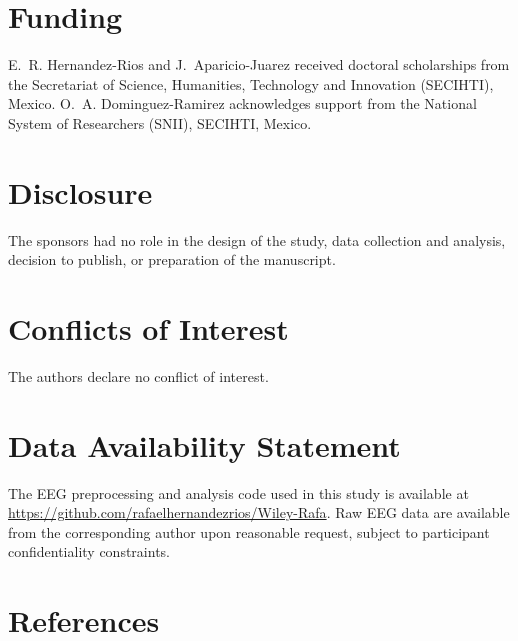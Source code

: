 \documentclass[10pt]{iopart}
\begin{document}
\section*{Funding}
E.~R. Hernandez-Rios and J.~Aparicio-Juarez received doctoral
scholarships from the Secretariat of Science, Humanities,
Technology and Innovation (SECIHTI), Mexico.
O.~A. Dominguez-Ramirez acknowledges support from the
National System of Researchers (SNII), SECIHTI, Mexico.

\section*{Disclosure}
The sponsors had no role in the design of the study,
data collection and analysis, decision to publish,
or preparation of the manuscript.

\section*{Conflicts of Interest}
The authors declare no conflict of interest.

\section*{Data Availability Statement}
The EEG preprocessing and analysis code used in this study
is available at \url{https://github.com/rafaelhernandezrios/Wiley-Rafa}.
Raw EEG data are available from the corresponding author upon
reasonable request, subject to participant confidentiality
constraints.

\section*{References}
\end{document}
